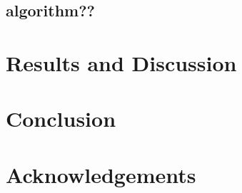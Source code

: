 \documentclass[11pt,
  paper=a4, 
  bibliography=totocnumbered,
	captions=tableheading,
	BCOR=10mm
]{scrreprt}
\theoremstyle{definition}
\begin{document}
\section{algorithm??}




\chapter{Results and Discussion}


\chapter{Conclusion}


\chapter*{Acknowledgements}



\glsaddall
\printglossaries

\printbibliography
\end{document}
